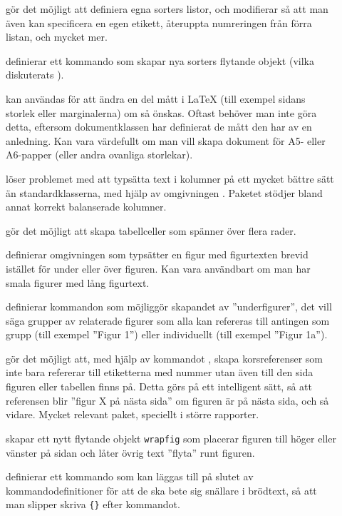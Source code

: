 \documentclass[../../latex.tex]{subfiles}
\begin{document}
\begin{description}
	\item[]
	gör det möjligt att definiera egna sorters listor, och modifierar 
		så att man även kan specificera en egen etikett, återuppta
	numreringen från förra listan, och mycket mer.
	
	\item[]
	definierar ett kommando  som skapar nya sorters flytande
	objekt (vilka diskuterats ).
	
	\item[]
	kan användas för att ändra en del mått i \LaTeX{} (till exempel sidans
	storlek eller marginalerna) om så önskas. Oftast behöver man inte göra
	detta, eftersom dokumentklassen har definierat de mått den har av en
	anledning. Kan vara värdefullt om man vill skapa dokument för A5-%
	eller A6-papper (eller andra ovanliga storlekar).

 	\item[]
 	löser problemet med att typsätta text i kolumner på ett mycket bättre
 	sätt än standardklasserna, med hjälp av omgivningen .
 	Paketet stödjer bland annat korrekt balanserade kolumner.
 	
	\item[]
	gör det möjligt att skapa tabellceller som spänner över flera
	rader.
	
	\item[]
	definierar omgivningen  som typsätter en figur med
	figurtexten brevid istället för under eller över figuren. Kan vara
	användbart om man har smala figurer med lång figurtext.
	
	\item[]
	definierar kommandon som möjliggör skapandet av ”underfigurer”, det
	vill säga grupper av relaterade figurer som alla kan refereras till
	antingen som grupp (till exempel ”Figur 1”) eller individuellt (till
	exempel ”Figur 1a”).
	
	\item[]
	gör det möjligt att, med hjälp av kommandot ,
	skapa korsreferenser
	som inte bara refererar till etiketterna med nummer utan även till den
	sida figuren eller tabellen finns på. Detta görs på ett intelligent
	sätt, så att referensen blir ”figur X på nästa sida” om figuren är på
	nästa sida, och så vidare. Mycket relevant paket, speciellt i större
	rapporter.
	
	\item[]
	skapar ett nytt flytande objekt \texttt{wrapfig} som placerar figuren
	till höger eller vänster på sidan och låter övrig text ”flyta” runt
	figuren.
	
	\item[]
	definierar ett kommando  som kan läggas till på slutet av
	kommandodefinitioner för att de ska bete sig snällare i brödtext, så
	att man slipper skriva \texttt{\{\}} efter kommandot.
\end{description}
\end{document}
